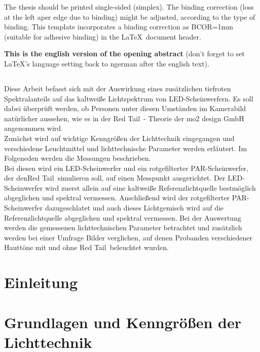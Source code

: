 The thesis should be printed single-sided (simplex). The binding correction (loss at the left aper edge due to binding) might be adjusted, according to the type of binding. This template incorporates a binding correction as BCOR=1mm (suitable for adhesive binding) in the \LaTeX\ document header.

{\bfseries This is the english version of the opening abstract} (don't forget to set \LaTeX's language setting back to ngerman after the english text). 
 
 
\section*{\centering\abstractname}

Diese Arbeit befasst sich mit der Auswirkung eines zusätzlichen tiefroten Spektralanteils auf das kaltweiße Lichtspektrum von LED-Scheinwerfern. Es soll dabei überprüft werden, ob Personen unter diesen Umständen im Kamerabild natürlicher aussehen, wie es in der \glqq Red Tail\grqq\ - Theorie der mo2 design GmbH angenommen wird.\\
Zunächst wird auf wichtige Kenngrößen der Lichttechnik eingegangen und verschiedene Leuchtmittel und lichttechnische Parameter werden erläutert. Im Folgeneden werden die Messungen beschrieben.\\
Bei diesen wird ein LED-Scheinwerfer und ein rotgefilterter PAR-Scheinwerfer, der den\glqq Red Tail\grqq\ simulieren soll, auf einen Messpunkt ausgerichtet. Der LED-Scheinwerfer wird zuerst allein auf eine kaltweiße Referenzlichtquelle bestmöglich abgeglichen und spektral vermessen. Anschließend wird der rotgefilterter PAR-Scheinwerfer dazugeschlatet und auch dieses Lichtgemisch wird auf die Referenzlichtquelle abgeglichen und spektral vermessen. 
Bei der Auswertung werden die gemessenen lichttechnischen Parameter betrachtet und zusätzlich werden bei einer Umfrage Bilder verglichen, auf denen Probanden verschiedener Hauttöne mit und ohne \glqq Red Tail\grqq\ beleuchtet wurden.





\chapter{Einleitung}

\chapter{Grundlagen und Kenngrößen der Lichttechnik} \label{chap_grundlagen}

